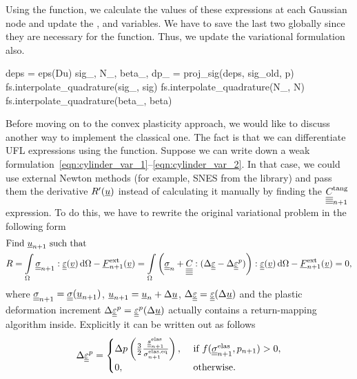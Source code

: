 \documentclass[12pt]{article}
\begin{document}
Using the  function, we calculate the values of these expressions at each Gaussian node and update the ,  and  variables. We have to save the last two globally since they are necessary for the  function. Thus, we update the variational formulation also.
\begin{pythoncode}
    deps = eps(Du)
    sig_, N_, beta_, dp_ = proj_sig(deps, sig_old, p)
    fs.interpolate_quadrature(sig_, sig)
    fs.interpolate_quadrature(N_, N)
    fs.interpolate_quadrature(beta_, beta)
\end{pythoncode}

Before moving on to the convex plasticity approach, we would like to discuss another way to implement the classical one. The fact is that we can differentiate UFL expressions using the  function. Suppose we can write down a weak formulation~\eqref{eqn:cylinder_var_1}--\eqref{eqn:cylinder_var_2}. In that case, we could use external Newton methods (for example, SNES from the  library) and pass them the derivative $R^\prime(\underline{u})$ instead of calculating it manually by finding the $\underline{\underline{\underline{\underline{C_{}}}}}_{n+1}^\text{tang}$ expression. To do this, we have to rewrite the original variational problem in the following form
\begin{align}
    & \text{Find } \underline{u}_{n+1} \text{ such that} \label{eqn:cylinder_SNES_var_1} \\
    & R = \int\limits_\Omega \underline{\underline{\sigma}}_{n+1} : \underline{\underline{\varepsilon}}(\underline{v}) \, \mathrm{d}\Omega - \underline{F}_{n+1}^\text{ext}(\underline{v}) = \int\limits_\Omega \left( \underline{\underline{\sigma}}_n + \underline{\underline{\underline{\underline{C_{}}}}} : (\Delta\underline{\underline{\varepsilon}} - \Delta\underline{\underline{\varepsilon}}^p) \right) : \underline{\underline{\varepsilon}}(\underline{v}) \, \mathrm{d}\Omega - \underline{F}_{n+1}^\text{ext}(\underline{v}) = 0, \label{eqn:cylinder_SNES_var_2}
\end{align}
where $\underline{\underline{\sigma}}_{n+1} = \underline{\underline{\sigma}}(\underline{u}_{n+1})$, $\underline{u}_{n+1} = \underline{u}_{n} + \Delta\underline{u}$, $\Delta\underline{\underline{\varepsilon}} = \underline{\underline{\varepsilon}}(\Delta\underline{u})$ and the plastic deformation increment $\Delta\underline{\underline{\varepsilon}}^p = \underline{\underline{\varepsilon}}^p(\Delta\underline{u})$ actually contains a return-mapping algorithm inside. Explicitly it can be written out as follows
\begin{equation}
    \Delta\underline{\underline{\varepsilon}}^p = 
        \begin{cases}
            \Delta p \left( \frac{3}{2}\frac{\underline{\underline{s}}_{n+1}^\text{elas}} {\sigma_{n+1}^\text{elas,eq}} \right), & \text{ if } f(\underline{\underline{\sigma}}_{n+1}^{\text{elas}}, p_{n+1}) > 0,  \\
            0, & \text{ otherwise}.
        \end{cases}
\end{equation}
\end{document}
